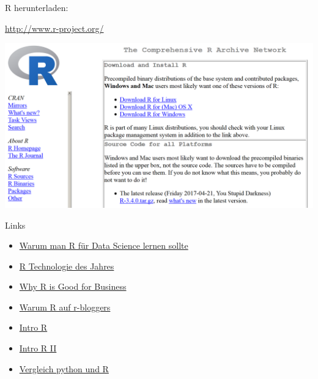\documentclass[
  ignorenonframetext,
]{beamer}
\begin{document}
\begin{frame}{R herunterladen:}
\protect\hypertarget{r-herunterladen}{}

\url{http://www.r-project.org/}

\includegraphics{figure/CRAN1picture.PNG}

\end{frame}

\begin{frame}{Links}
\protect\hypertarget{links}{}

\begin{itemize}
\item
  \href{http://www.r-bloggers.com/why-you-should-learn-r-first-for-data-science/}{Warum
  man R für Data Science lernen sollte}
\item
  \href{http://www.r-bloggers.com/rstudio-infoworld-2015-technology-of-the-year-award-recipient/}{R
  Technologie des Jahres}
\item
  \href{http://www.fastcolabs.com/3030063/why-the-r-programming-language-is-good-for-business}{Why
  R is Good for Business}
\item
  \href{http://www.r-bloggers.com/why-use-r/}{Warum R auf r-bloggers}
\item
  \href{http://www.ats.ucla.edu/stat/r/seminars/intro.htm}{Intro R}
\item
  \href{http://www.ats.ucla.edu/stat/r/sk/}{Intro R II}
\item
  \href{http://www.dataschool.io/python-or-r-for-data-science/}{Vergleich
  python und R}
\end{itemize}

\end{frame}
\end{document}
